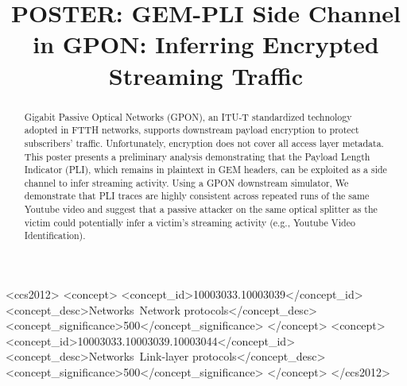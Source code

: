 \documentclass[sigconf,anonymous]{acmart}
\begin{document}
\title{POSTER: GEM-PLI Side Channel in GPON: Inferring Encrypted Streaming Traffic}

%
%
%


\begin{abstract}
Gigabit Passive Optical Networks (GPON), an ITU-T standardized technology adopted in FTTH networks, supports downstream payload encryption to protect subscribers' traffic. Unfortunately, encryption does not cover all access layer metadata. This poster presents a preliminary analysis demonstrating that the Payload Length Indicator (PLI), which remains in plaintext in GEM headers, can be exploited as a side channel to infer streaming activity. Using a GPON downstream simulator, We demonstrate that PLI traces are highly consistent across repeated runs of the same Youtube video and suggest that a passive attacker on the same optical splitter as the victim could potentially infer a victim's streaming activity (e.g., Youtube Video Identification).
\end{abstract}


\begin{CCSXML}
<ccs2012>
   <concept>
       <concept_id>10003033.10003039</concept_id>
       <concept_desc>Networks~Network protocols</concept_desc>
       <concept_significance>500</concept_significance>
       </concept>
   <concept>
       <concept_id>10003033.10003039.10003044</concept_id>
       <concept_desc>Networks~Link-layer protocols</concept_desc>
       <concept_significance>500</concept_significance>
       </concept>
 </ccs2012>
\end{CCSXML}



\end{document}
